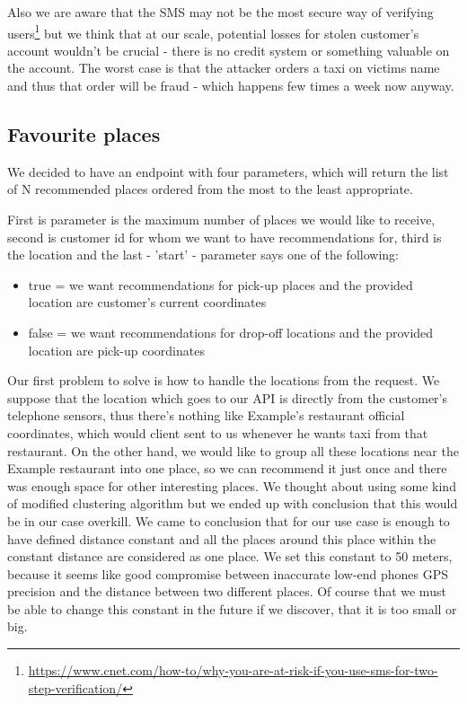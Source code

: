  Also we are aware that the SMS may not be the most secure way of verifying users\footnote{\url{https://www.cnet.com/how-to/why-you-are-at-risk-if-you-use-sms-for-two-step-verification/}} but we think that at our scale, potential losses for stolen customer's account wouldn't be crucial - there is no credit system or something valuable on the account. The worst case is that the attacker orders a taxi on victims name and thus that order will be fraud - which happens few times a week now anyway.
 
 \subsection{Favourite places}
 We decided to have an endpoint with four parameters, which will return the list of N recommended places ordered from the most to the least appropriate.
 
 First is parameter is the maximum number of places we would like to receive, second is customer id for whom we want to have recommendations for, third is the location and the last - 'start' - parameter  says one of the following:
 \begin{itemize}
 	\item true = we want recommendations for pick-up places and the provided location are customer's current coordinates
 	\item false = we want recommendations for drop-off locations and the provided location are pick-up coordinates
 \end{itemize}
 
 Our first problem to solve is how to handle the locations from the request. We suppose that the location which goes to our API is directly from the customer's telephone sensors, thus there's nothing like Example's restaurant official coordinates, which would client sent to us whenever he wants taxi from that restaurant. On the other hand, we would like to group all these locations near the Example restaurant into one place, so we can recommend it just once and there was enough space for other interesting places. We thought about using some kind of modified clustering algorithm but we ended up with conclusion that this would be in our case overkill. We came to conclusion that for our use case is enough to have defined distance constant and all the places around this place within the constant distance are considered as one place. We set this constant to 50 meters, because it seems like good compromise between inaccurate low-end phones GPS precision and the distance between two different places. Of course that we must be able to change this constant in the future if we discover, that it is too small or big.
 
